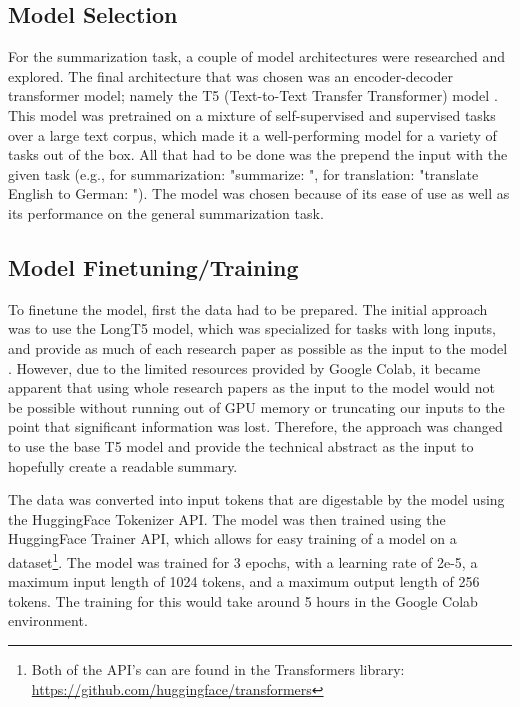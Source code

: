 \documentclass[11pt,a4paper]{article}
\begin{document}
\subsection{Model Selection}
\indent \indent For the summarization task, a couple of model architectures were researched and explored. The final architecture that was chosen was an encoder-decoder transformer model; namely the T5 (Text-to-Text Transfer Transformer) model \cite{raffel2020exploring}. This model was pretrained on a mixture of self-supervised and supervised tasks over a large text corpus, which made it a well-performing model for a variety of tasks out of the box. All that had to be done was the prepend the input with the given task (e.g., for summarization: "summarize: ", for translation: "translate English to German: "). The model was chosen because of its ease of use as well as its performance on the general summarization task.

\subsection{Model Finetuning/Training}
\indent \indent To finetune the model, first the data had to be prepared. The initial approach was to use the LongT5 model, which was specialized for tasks with long inputs, and provide as much of each research paper as possible as the input to the model \cite{guo2022longt5}. However, due to the limited resources provided by Google Colab, it became apparent that using whole research papers as the input to the model would not be possible without running out of GPU memory or truncating our inputs to the point that significant information was lost. Therefore, the approach was changed to use the base T5 model and provide the technical abstract as the input to hopefully create a readable summary.


The data was converted into input tokens that are digestable by the model using the HuggingFace Tokenizer API. The model was then trained using the HuggingFace Trainer API, which allows for easy training of a model on a dataset\footnote{Both of the API's can are found in the Transformers library: \url{https://github.com/huggingface/transformers}}. The model was trained for 3 epochs, with a learning rate of 2e-5, a maximum input length of 1024 tokens, and a maximum output length of 256 tokens. The training for this would take around 5 hours in the Google Colab environment.
\end{document}
